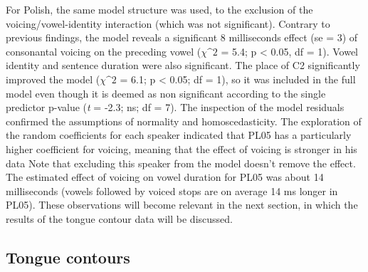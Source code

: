 \documentclass[authoryear, twocolumn]{elsarticle}
\begin{document}
For Polish, the same model structure was used, to the exclusion of the
voicing/vowel-identity interaction (which was not significant). Contrary
to previous findings, the model reveals a significant 8 milliseconds
effect (se = 3) of consonantal voicing on the preceding vowel
(\(\chi\^2\) = 5.4; p \textless{} 0.05, df = 1). Vowel identity and
sentence duration were also significant. The place of C2 significantly
improved the model (\(\chi\^2\) = 6.1; p \textless{} 0.05; df = 1), so
it was included in the full model even though it is deemed as non
significant according to the single predictor p-value (\emph{t} = -2.3;
ns; df = 7). The inspection of the model residuals confirmed the
assumptions of normality and homoscedasticity. The exploration of the
random coefficients for each speaker indicated that PL05 has a
particularly higher coefficient for voicing, meaning that the effect of
voicing is stronger in his data Note that excluding this speaker from
the model doesn't remove the effect. The estimated effect of voicing on
vowel duration for PL05 was about 14 milliseconds (vowels followed by
voiced stops are on average 14 ms longer in PL05). These observations
will become relevant in the next section, in which the results of the
tongue contour data will be discussed.

\subsection{Tongue contours}\label{tongue-contours}

\label{s:splines}
\end{document}
